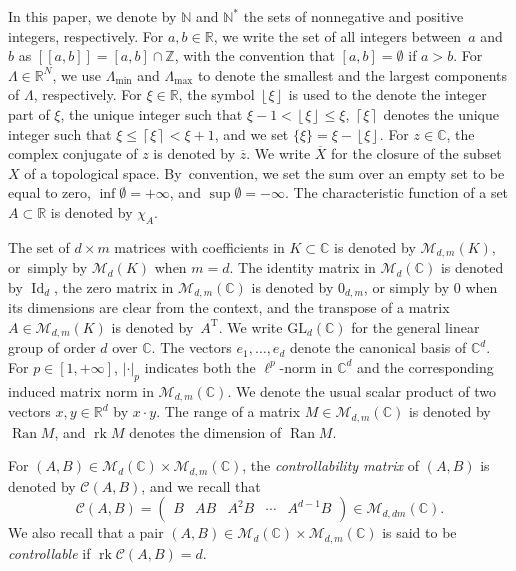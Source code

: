 \documentclass[JEP,XML,SOM,Unicode]{cedram}
\newcommand{\llbracket}{[\![}
\newcommand{\rrbracket}{]\!]}
\theoremstyle{plain}
\theoremstyle{definition}
\DeclareMathOperator{\rank}{rk}
\DeclareMathOperator{\range}{Ran}
\DeclareMathOperator{\id}{Id}
\newcommand{\transp}{{\scriptscriptstyle\mathrm{T}}}
\newcommand{\abs}[1]{\left\lvert #1\right \rvert}
\newcommand{\floor}[1]{\left\lfloor #1 \right\rfloor}
\newcommand{\ceil}[1]{\left\lceil #1 \right\rceil}
\begin{document}
In this paper, we denote by $\mathbb N$ and $\mathbb N^\ast$ the sets of nonnegative and positive integers, respectively. For $a, b \in \mathbb R$, we write the set of all integers between~$a$ and~$b$ as $\llbracket a, b \rrbracket = [a, b] \cap \mathbb Z$, with the convention that $[a, b] = \emptyset$ if $a > b$. For \hbox{$\Lambda \in \mathbb R^N$}, we use $\Lambda_{\min}$ and $\Lambda_{\max}$ to denote the smallest and the largest components of $\Lambda$, respec\-tively. For $\xi \in \mathbb R$, the symbol $\floor{\xi}$ is used to the denote the integer part of $\xi$, \ie the unique integer such that $\xi - 1 < \floor{\xi} \leq \xi$, $\ceil{\xi}$ denotes the unique integer such that $\xi \leq \ceil{\xi} < \xi + 1$, and we set $\{\xi\} = \xi - \floor{\xi}$. For $z \in \mathbb C$, the complex conjugate of $z$ is denoted by $\overline z$. We write $\overline X$ for the closure of the subset $X$ of a topological space. By~convention, we set the sum over an empty set to be equal to zero, $\inf\emptyset = +\infty$, and $\sup\emptyset = -\infty$. The characteristic function of a set $A \subset \mathbb R$ is denoted by $\chi_A$.

The set of $d \times m$ matrices with coefficients in $K \subset \mathbb C$ is denoted by $\mathcal M_{d, m}(K)$, or~simply by $\mathcal M_d(K)$ when $m = d$. The identity matrix in $\mathcal M_d(\mathbb C)$ is denoted by $\id_d$, the zero matrix in $\mathcal M_{d, m}(\mathbb C)$ is denoted by $0_{d, m}$, or simply by $0$ when its dimensions are clear from the context, and the transpose of a matrix $A \in \mathcal M_{d, m}(K)$ is denoted by~$A^\transp$. We write $\mathrm{GL}_d(\mathbb C)$ for the general linear group of order $d$ over $\mathbb C$. The vectors $e_1, \dots, e_d$ denote the canonical basis of $\mathbb C^d$. For $p \in [1, +\infty]$, $\abs{\cdot}_{p}$ indicates both the $\ell^p$-norm in $\mathbb C^d$ and the corresponding induced matrix norm in $\mathcal M_{d, m}(\mathbb C)$. We denote the usual scalar product of two vectors $x, y \in \mathbb R^d$ by $x \cdot y$. The range of a matrix $M \in \mathcal M_{d, m}(\mathbb C)$ is denoted by $\range M$, and $\rank M$ denotes the dimension of $\range M$.

For $(A, B) \in \mathcal M_{d}(\mathbb C) \times \mathcal M_{d, m}(\mathbb C)$, the \emph{controllability matrix} of $(A, B)$ is denoted by $\mathcal C(A, B)$, and we recall that
\[
\mathcal C(A, B) = \begin{pmatrix}
B & A B & A^2 B & \cdots & A^{d-1} B \\
\end{pmatrix} \in \mathcal M_{d, d m}(\mathbb C).
\]
We also recall that a pair $(A, B) \in \mathcal M_{d}(\mathbb C) \times \mathcal M_{d, m}(\mathbb C)$ is said to be \emph{controllable} if $\rank \mathcal C(A, B) = d$.
\end{document}
